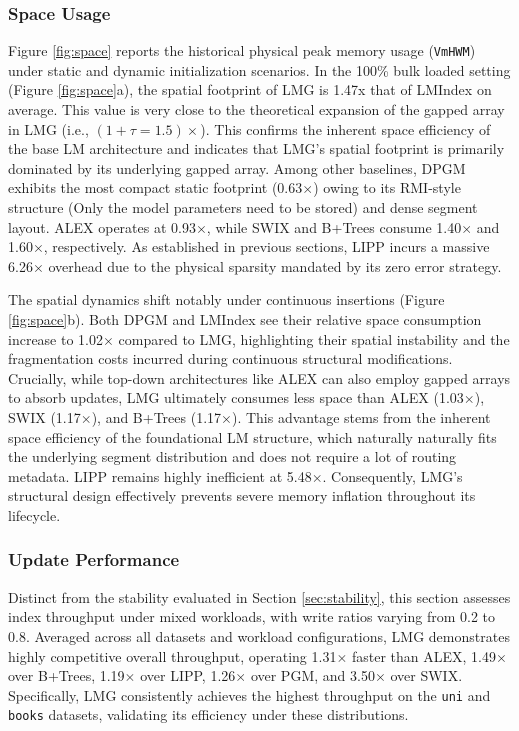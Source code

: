 \subsubsection{Space Usage}
Figure \ref{fig:space} reports the historical physical peak memory usage (\texttt{VmHWM}) under static and dynamic initialization scenarios. In the 100\% bulk loaded setting (Figure \ref{fig:space}a), the spatial footprint of LMG is 1.47x that of LMIndex on average. This value is very close to the theoretical expansion of the gapped array in LMG (i.e., $(1 + \tau = 1.5)\times$). This confirms the inherent space efficiency of the base LM architecture and indicates that LMG's spatial footprint is primarily dominated by its underlying gapped array. Among other baselines, DPGM exhibits the most compact static footprint (0.63$\times$) owing to its RMI-style structure (Only the model parameters need to be stored) and dense segment layout. ALEX operates at 0.93$\times$, while SWIX and B+Trees consume 1.40$\times$ and 1.60$\times$, respectively. As established in previous sections, LIPP incurs a massive 6.26$\times$ overhead due to the physical sparsity mandated by its zero error strategy.

The spatial dynamics shift notably under continuous insertions (Figure \ref{fig:space}b). Both DPGM and LMIndex see their relative space consumption increase to 1.02$\times$ compared to LMG, highlighting their spatial instability and the fragmentation costs incurred during continuous structural modifications. Crucially, while top-down architectures like ALEX can also employ gapped arrays to absorb updates, LMG ultimately consumes less space than ALEX (1.03$\times$), SWIX (1.17$\times$), and B+Trees (1.17$\times$). This advantage stems from the inherent space efficiency of the foundational LM structure, which naturally naturally fits the underlying segment distribution and does not require a lot of routing metadata. LIPP remains highly inefficient at 5.48$\times$. Consequently, LMG's structural design effectively prevents severe memory inflation throughout its lifecycle.

\subsubsection{Update Performance}
Distinct from the stability evaluated in Section \ref{sec:stability}, this section assesses index throughput under mixed workloads, with write ratios varying from 0.2 to 0.8. Averaged across all datasets and workload configurations, LMG demonstrates highly competitive overall throughput, operating 1.31$\times$ faster than ALEX, 1.49$\times$ over B+Trees, 1.19$\times$ over LIPP, 1.26$\times$ over PGM, and 3.50$\times$ over SWIX. Specifically, LMG consistently achieves the highest throughput on the \texttt{uni} and \texttt{books} datasets, validating its efficiency under these distributions.

